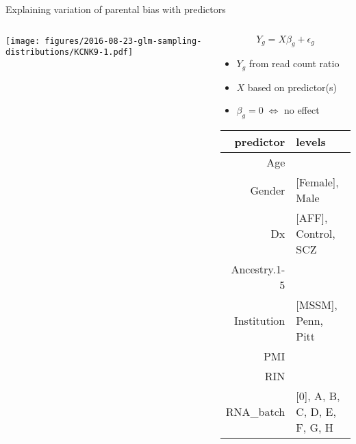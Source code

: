 \documentclass{beamer}
\newcommand{\platefigscale}[0]{0.7}
\begin{document}
\begin{frame}{Explaining variation of parental bias with predictors}
\begin{columns}
\begin{column}{0.60\textwidth}

\texttt{[image: figures/2016-08-23-glm-sampling-distributions/KCNK9-1.pdf]}
\end{column}
\begin{column}{0.45\textwidth}
\begin{equation*}
Y_g = X \beta_g + \epsilon_g
\end{equation*}
\vfill
\footnotesize
\begin{itemize}
\item \(Y_g\) from read count ratio
\item \(X\) based on predictor(s)
\item \( \beta_g = 0 \; \Leftrightarrow \) no effect
\end{itemize}
\tiny
\vfill
\begin{tabular}{|r|l|}
\hline
predictor & levels \\
\hline
Age & \\
Gender & [Female], Male\\
Dx & [AFF], Control, SCZ\\
Ancestry.1-5 & \\
Institution & [MSSM], Penn, Pitt\\
PMI & \\
RIN & \\
RNA\_batch & [0], A, B, C, D, E, F, G, H\\
\hline
\end{tabular}


\end{column}
\end{columns}
\end{frame}
\end{document}
